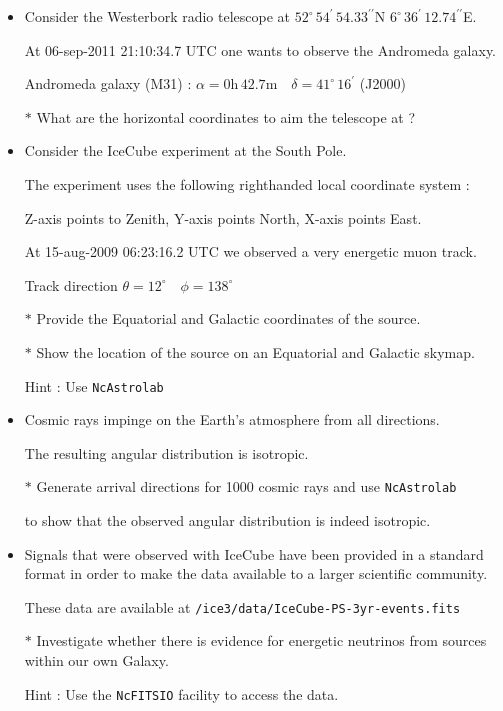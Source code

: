 {\red
\begin{itemize}
\item Consider the Westerbork radio telescope at
      $52^{\circ}\,54^{\prime}\,54.33^{\prime\prime}$N
      $6^{\circ}\,36^{\prime}\,12.74^{\prime\prime}$E.
\item[] At 06-sep-2011 21:10:34.7 UTC one wants to observe the Andromeda galaxy.
\item[] Andromeda galaxy (M31) : $\alpha=0\text{h}\,42.7\text{m} \quad \delta=41^{\circ}\,16^{\prime}$ (J2000)
\item[$\ast$] What are the horizontal coordinates to aim the telescope at ?
\item Consider the IceCube experiment at the South Pole.
\item[] The experiment uses the following righthanded local coordinate system :
\item[] Z-axis points to Zenith, Y-axis points North, X-axis points East.
\item[] At 15-aug-2009 06:23:16.2 UTC we observed a very energetic muon track.
\item[] Track direction $\theta=12^{\circ} \quad \phi=138^{\circ}$
\item[$\ast$] Provide the Equatorial and Galactic coordinates of the source.
\item[$\ast$] Show the location of the source on an Equatorial and Galactic skymap.
\item[] Hint : Use {\tt NcAstrolab}
\end{itemize}
}

\Tr
{\red
\begin{itemize}
\item Cosmic rays impinge on the Earth's atmosphere from all directions.
\item[] The resulting angular distribution is isotropic.
\item[$\ast$] Generate arrival directions for 1000 cosmic rays and use {\tt NcAstrolab}
\item[] to show that the observed angular distribution is indeed isotropic.
\item Signals that were observed with IceCube have been provided in a standard format
      in order to make the data available to a larger scientific community.
\item[] These data are available at {\tt /ice3/data/IceCube-PS-3yr-events.fits}
\item[$\ast$] Investigate whether there is evidence for energetic neutrinos from sources within our own Galaxy.
\item[] Hint : Use the {\tt NcFITSIO} facility to access the data.
\end{itemize}
}